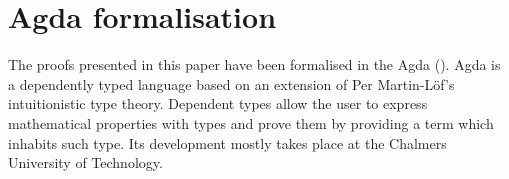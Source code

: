 \documentclass[twoside]{aiml20}
\begin{document}
\section{Agda formalisation}
%
%
%
%
%
The proofs presented in this paper have been formalised in the Agda (\cite{norell:thesis}). Agda is a dependently typed language based on an extension of Per Martin-Löf's intuitionistic type theory. Dependent types allow the user to express mathematical properties with types and prove them by providing a term which inhabits such type.
Its development mostly takes place at the Chalmers University of Technology.
\end{document}
